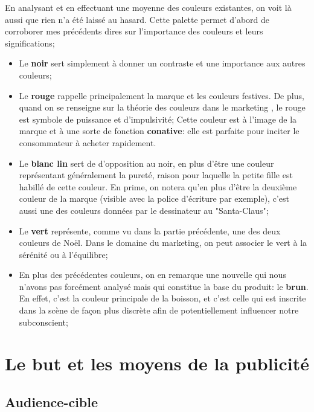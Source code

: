 En analysant et en effectuant une moyenne des couleurs existantes, on voit là aussi que rien n'a été laissé au hasard.
Cette palette permet d'abord de corroborer mes précédents dires sur l'importance des couleurs et leurs significations;
\begin{itemize}
\item[\textcolor{palette1}{\textbullet}] Le \textbf{noir} sert simplement à donner un contraste et une importance aux autres couleurs;
\item[\textcolor{palette2}{\textbullet}] Le \textbf{rouge} rappelle principalement la marque et les couleurs festives. De plus, quand on se renseigne sur  la théorie des couleurs dans le marketing \parencite{Ref2}, le rouge est symbole de puissance et d'impulsivité;  Cette couleur est à l'image de la marque et à une sorte de fonction \textbf{conative}: elle est parfaite pour inciter le consommateur à acheter rapidement.
\item[\textcolor{palette3}{\textbullet}] Le \textbf{blanc lin} sert de d'opposition au noir, en plus d'être une couleur représentant généralement la pureté, raison pour laquelle la petite fille est habillé de cette couleur. En prime, on notera qu'en plus d'être la deuxième couleur de la marque (visible avec la police d'écriture par exemple), c'est aussi une des couleurs données par le dessinateur au "Santa-Claus";
\item[\textcolor{palette4}{\textbullet}] Le \textbf{vert} représente, comme vu dans la partie précédente, une des deux couleurs de Noël. Dans le domaine du marketing, on peut associer le vert à la sérénité ou à l'équilibre;
\item[\textcolor{palette5}{\textbullet}] En plus des précédentes couleurs, on en remarque une nouvelle qui nous n'avons pas forcément analysé mais qui constitue la base du produit: le \textbf{brun}. En effet, c'est la couleur principale de la boisson, et c'est celle qui est inscrite dans la scène de façon plus discrète afin de potentiellement influencer notre subconscient;
\end{itemize}


\section{Le but et les moyens de la publicité}

\subsection{Audience-cible}


